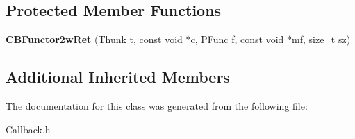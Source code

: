 \subsection*{Protected Member Functions}
\begin{DoxyCompactItemize}
\item 
{\bfseries C\+B\+Functor2w\+Ret} (Thunk t, const void $\ast$c, P\+Func f, const void $\ast$mf, size\+\_\+t sz)\label{classCBFunctor2wRet_a8048bc4a33945fc5f5bbee22097fcafa}

\end{DoxyCompactItemize}
\subsection*{Additional Inherited Members}


The documentation for this class was generated from the following file\+:\begin{DoxyCompactItemize}
\item 
Callback.\+h\end{DoxyCompactItemize}
